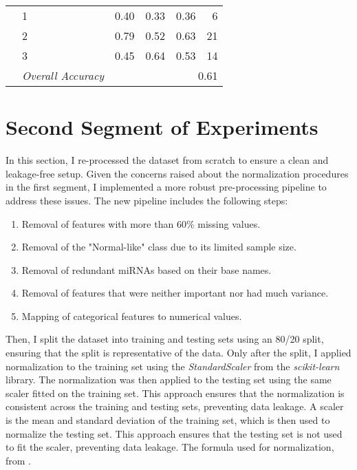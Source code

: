\begin{table}
{\begin{tabular}{llrrrr}
                     & 1                         & 0.40                     & 0.33            & 0.36              & 6                \\
                     & 2                         & 0.79                     & 0.52            & 0.63              & 21               \\
                     & 3                         & 0.45                     & 0.64            & 0.53              & 14               \\
      \cmidrule{2-6}
                     & \textit{Overall Accuracy} & \multicolumn{4}{r}{0.61}                                                          \\
      \bottomrule
    \end{tabular}
  }
\end{table}

\section{Second Segment of Experiments}
\label{sec:second_segment}

In this section, I re-processed the dataset from scratch to ensure a clean and
leakage-free setup. Given the concerns raised about the normalization
procedures in the first segment, I implemented a more robust pre-processing
pipeline to address these issues. The new pipeline includes the following
steps:
\begin{enumerate}
  \item Removal of features with more than 60\% missing values.
  \item Removal of the "Normal-like" class due to its limited sample size.
  \item Removal of redundant miRNAs based on their base names.
  \item Removal of features that were neither important nor had much variance.
  \item Mapping of categorical features to numerical values.
\end{enumerate}

Then, I split the dataset into training and testing sets using an 80/20 split,
ensuring that the split is representative of the data. Only after the split, I
applied normalization to the training set using the \textit{StandardScaler}
from the \textit{scikit-learn} library. The normalization was then applied to
the testing set using the same scaler fitted on the training set. This approach
ensures that the normalization is consistent across the training and testing
sets, preventing data leakage. A scaler is the mean and standard deviation of
the training set, which is then used to normalize the testing set. This
approach ensures that the testing set is not used to fit the scaler, preventing
data leakage. The formula used for normalization, from
\textcite{sklearn_normalization}.

